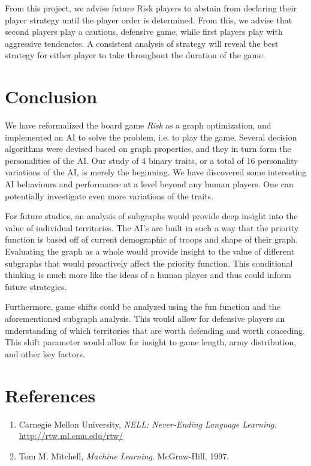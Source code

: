 \documentclass[12pt]{article}  %
\begin{document}
From this project, we advise future Risk players to abstain from declaring their player strategy until the player order is determined. From this, we advise that second players play a cautious, defensive game, while first players play with aggressive tendencies. A consistent analysis of strategy will reveal the best strategy for either player to take throughout the duration of the game. 



\section{Conclusion}
We have reformalized the board game \emph{Risk} as a graph optimization, and implemented an AI to solve the problem, i.e. to play the game. Several decision algorithms were devised based on graph properties, and they in turn form the personalities of the AI. Our study of 4 binary traits, or a total of 16 personality variations of the AI, is merely the beginning. We have discovered some interesting AI behaviours and performance at a level beyond any human players. One can potentially investigate even more variations of the traits.

For future studies, an analysis of subgraphs would provide deep insight into the value of individual territories. The AI’s are built in such a way that the priority function is based off of current demographic of troops and shape of their graph. Evaluating the graph as a whole would provide insight to the value of different subgraphs that would proactively affect the priority function. This conditional thinking is much more like the ideas of a human player and thus could inform future strategies. 

Furthermore, game shifts could be analyzed using the fun function and the aforementioned subgraph analysis. This would allow for defensive players an understanding of which territories that are worth defending and worth conceding. This shift parameter would allow for insight to game length, army distribution, and other key factors.  





\section{References}


\begin{enumerate}

\item Carnegie Mellon University, \emph{NELL: Never-Ending Language Learning}. \url{http://rtw.ml.cmu.edu/rtw/}\label{NELL}

\item Tom M. Mitchell, \emph{Machine Learning}. McGraw-Hill, 1997.\label{Mitchell}
\end{enumerate}
\end{document}
